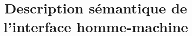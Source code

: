 

\title{Description sémantique de l'interface homme-machine}

\setcounter{tocdepth}{0}

    \maketitle
    \tableofcontents
    

